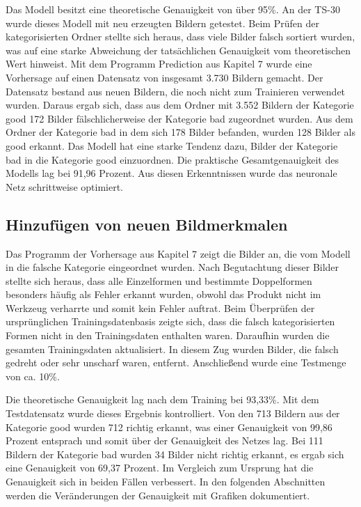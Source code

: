 	
Das Modell besitzt eine theoretische Genauigkeit von über 95\%. An der TS-30 wurde dieses 
Modell mit neu erzeugten Bildern getestet. Beim Prüfen der kategorisierten Ordner
stellte sich heraus, dass viele Bilder falsch sortiert wurden, was auf eine starke Abweichung
der tatsächlichen Genauigkeit vom theoretischen Wert hinweist. Mit dem Programm Prediction 
aus Kapitel 7 wurde eine Vorhersage auf einen Datensatz von insgesamt 3.730
Bildern gemacht. Der Datensatz bestand aus neuen Bildern, die noch nicht zum Trainieren 
verwendet wurden. Daraus ergab sich, dass aus dem Ordner mit 3.552 Bildern der
Kategorie good 172 Bilder fälschlicherweise der Kategorie bad zugeordnet wurden. Aus
dem Ordner der Kategorie bad in dem sich 178 Bilder befanden, wurden 128 Bilder als
good erkannt. Das Modell hat eine starke Tendenz dazu, Bilder der Kategorie bad in die
Kategorie good einzuordnen. Die praktische Gesamtgenauigkeit des Modells lag bei 91,96
Prozent. Aus diesen Erkenntnissen wurde das neuronale Netz schrittweise optimiert.

\subsection{Hinzufügen von neuen Bildmerkmalen}

Das Programm der Vorhersage aus Kapitel 7 zeigt die Bilder an, die vom Modell in
die falsche Kategorie eingeordnet wurden. Nach Begutachtung dieser Bilder stellte sich
heraus, dass alle Einzelformen und bestimmte Doppelformen besonders häufig als Fehler
erkannt wurden, obwohl das Produkt nicht im Werkzeug verharrte und somit kein Fehler
auftrat. Beim Überprüfen der ursprünglichen Trainingsdatenbasis zeigte sich, dass die
falsch kategorisierten Formen nicht in den Trainingsdaten enthalten waren. Daraufhin
wurden die gesamten Trainingsdaten aktualisiert. In diesem Zug wurden Bilder, die falsch
gedreht oder sehr unscharf waren, entfernt. Anschließend wurde eine Testmenge von ca.
10\%.

Die theoretische Genauigkeit lag nach dem Training bei 93,33\%. Mit dem Testdatensatz
wurde dieses Ergebnis kontrolliert. Von den 713 Bildern aus der Kategorie good wurden
712 richtig erkannt, was einer Genauigkeit von 99,86 Prozent entsprach und somit über
der Genauigkeit des Netzes lag. Bei 111 Bildern der Kategorie bad wurden 34 Bilder	
nicht richtig erkannt, es ergab sich eine Genauigkeit von 69,37 Prozent. Im Vergleich
zum Ursprung hat die Genauigkeit sich in beiden Fällen verbessert. In den folgenden
Abschnitten werden die Veränderungen der Genauigkeit mit Grafiken dokumentiert.

